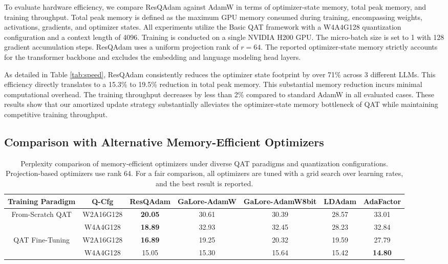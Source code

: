 \documentclass{article} %
\begin{document}
To evaluate hardware efficiency, we compare ResQAdam against AdamW in terms of optimizer-state memory, total peak memory, and training throughput. 
Total peak memory is defined as the maximum GPU memory consumed during training, encompassing weights, activations, gradients, and optimizer states. 
All experiments utilize the Basic QAT framework with a W4A4G128 quantization configuration and a context length of 4096. Training is conducted on a single NVIDIA H200 GPU. 
The micro-batch size is set to 1 with 128 gradient accumulation steps.
ResQAdam uses a uniform projection rank of $r=64$. 
The reported optimizer-state memory strictly accounts for the transformer backbone and excludes the embedding and language modeling head layers.

As detailed in Table \ref{tab:speed}, ResQAdam consistently reduces the optimizer state footprint by over 71\% across 3 different LLMs. This efficiency directly translates to a 15.3\% to 19.5\% reduction in total peak memory. 
This substantial memory reduction incurs minimal computational overhead. 
The training throughput decreases by less than 2\% compared to standard AdamW in all evaluated cases. 
These results show that our amortized update strategy substantially alleviates the optimizer-state memory bottleneck of QAT while maintaining competitive training throughput.

\subsection{Comparison with Alternative Memory-Efficient Optimizers}
\begin{table}[t]
\scriptsize
\centering
\caption{Perplexity comparison of memory-efficient optimizers under diverse QAT paradigms and quantization configurations. Projection-based optimizers use rank 64. For a fair comparison, all optimizers are tuned with a grid search over learning rates, and the best result is reported.}
\label{tab:optimizer_ppl}
\vspace{-0.1in}
\begin{tabular}{c|c|ccccc}
\toprule
Training Paradigm \rule[-1.5ex]{0pt}{4ex}                & Q-Cfg      & ResQAdam & GaLore-AdamW & GaLore-AdamW8bit & LDAdam & AdaFactor \\ \hline
\multirow{2}{*}{From-Scratch QAT} & W2A16G128 \rule[-0.8ex]{0pt}{3ex}   & \textbf{20.05}    & 30.61       & 30.39           &  28.57  & 33.01     \\ \cline{2-7} 
                                  & W4A4G128 \rule[-0.8ex]{0pt}{3ex}   & \textbf{18.89}    & 32.93       & 32.45           & 28.23  & 32.84     \\ \hline \hline
\multirow{2}{*}{QAT Fine-Tuning}  & W2A16G128 \rule[-0.8ex]{0pt}{3ex}   & \textbf{16.89}    & 19.25       & 20.32           & 19.59  &  27.79     \\ \cline{2-7} 
                                  & W4A4G128 \rule[-0.8ex]{0pt}{3ex}   & 15.05    & 15.30       & 15.64           & 15.42  & \textbf{14.80}    \\ \bottomrule
\end{tabular}
\vspace{-10px}
\end{table}
\end{document}
